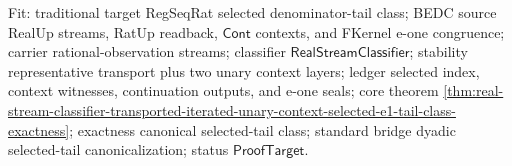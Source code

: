 Fit: traditional target RegSeqRat selected denominator-tail class; BEDC source
RealUp streams, RatUp readback, $\mathsf{Cont}$ contexts, and FKernel e-one
congruence; carrier rational-observation streams; classifier
$\mathsf{RealStreamClassifier}$; stability representative transport plus two
unary context layers; ledger selected index, context witnesses, continuation
outputs, and e-one seals; core theorem
\autoref{thm:real-stream-classifier-transported-iterated-unary-context-selected-e1-tail-class-exactness};
exactness canonical selected-tail class; standard bridge dyadic selected-tail
canonicalization; status $\mathsf{ProofTarget}$.
